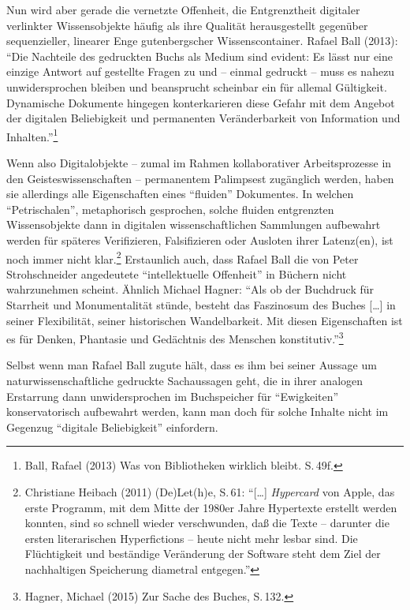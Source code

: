 \documentclass[a4paper,
fontsize=11pt,
oneside,
numbers=noperiodatend,
parskip=half-,
bibliography=totoc,
final
]{scrartcl}
\begin{document}
Nun wird aber gerade die vernetzte Offenheit, die Entgrenztheit
digitaler verlinkter Wissensobjekte häufig als ihre Qualität
herausgestellt gegenüber sequenzieller, linearer Enge gutenbergscher
Wissenscontainer. Rafael Ball (2013): \enquote{Die Nachteile des
gedruckten Buchs als Medium sind evident: Es lässt nur eine einzige
Antwort auf gestellte Fragen zu und -- einmal gedruckt -- muss es nahezu
unwidersprochen bleiben und beansprucht scheinbar ein für allemal
Gültigkeit. Dynamische Dokumente hingegen konterkarieren diese Gefahr
mit dem Angebot der digitalen Beliebigkeit und permanenten
Veränderbarkeit von Information und Inhalten.}\footnote{Ball, Rafael
  (2013) Was von Bibliotheken wirklich bleibt. S.\,49f.}

Wenn also Digitalobjekte -- zumal im Rahmen kollaborativer
Arbeitsprozesse in den Geisteswissenschaften -- permanentem Palimpsest
zugänglich werden, haben sie allerdings alle Eigenschaften eines
\enquote{fluiden} Dokumentes. In welchen \enquote{Petrischalen},
metaphorisch gesprochen, solche fluiden entgrenzten Wissensobjekte dann
in digitalen wissenschaftlichen Sammlungen aufbewahrt werden für
späteres Verifizieren, Falsifizieren oder Ausloten ihrer Latenz(en), ist
noch immer nicht klar.\footnote{Christiane Heibach (2011) (De)Let(h)e,
  S.\,61: \enquote{{[}\ldots{}{]} \emph{Hypercard} von Apple, das erste
  Programm, mit dem Mitte der 1980er Jahre Hypertexte erstellt werden
  konnten, sind so schnell wieder verschwunden, daß die Texte --
  darunter die ersten literarischen Hyperfictions -- heute nicht mehr
  lesbar sind. Die Flüchtigkeit und beständige Veränderung der Software
  steht dem Ziel der nachhaltigen Speicherung diametral entgegen.}}
Erstaunlich auch, dass Rafael Ball die von Peter Strohschneider
angedeutete \enquote{intellektuelle Offenheit} in Büchern nicht
wahrzunehmen scheint. Ähnlich Michael Hagner: \enquote{Als ob der
Buchdruck für Starrheit und Monumentalität stünde, besteht das
Faszinosum des Buches {[}\ldots{}{]} in seiner Flexibilität, seiner
historischen Wandelbarkeit. Mit diesen Eigenschaften ist es für Denken,
Phantasie und Gedächtnis des Menschen konstitutiv.}\footnote{Hagner,
  Michael (2015) Zur Sache des Buches, S.\,132.}

Selbst wenn man Rafael Ball zugute hält, dass es ihm bei seiner Aussage
um naturwissenschaftliche gedruckte Sachaussagen geht, die in ihrer
analogen Erstarrung dann unwidersprochen im Buchspeicher für
\enquote{Ewigkeiten} konservatorisch aufbewahrt werden, kann man doch
für solche Inhalte nicht im Gegenzug \enquote{digitale Beliebigkeit}
einfordern.
\end{document}
